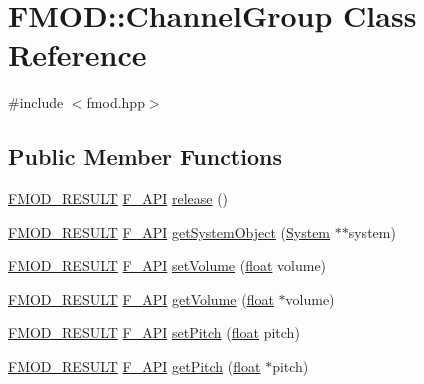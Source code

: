 \hypertarget{class_f_m_o_d_1_1_channel_group}{\section{F\-M\-O\-D\-:\-:Channel\-Group Class Reference}
\label{class_f_m_o_d_1_1_channel_group}
}


{\ttfamily \#include $<$fmod.\-hpp$>$}

\subsection*{Public Member Functions}
\begin{DoxyCompactItemize}
\item 
\hyperlink{fmod_8h_ae6ddadf8cb315e93ae7e6456b19db276}{F\-M\-O\-D\-\_\-\-R\-E\-S\-U\-L\-T} \hyperlink{fmod_8h_ace803d13e798b0cdde4384f9f323b901}{F\-\_\-\-A\-P\-I} \hyperlink{class_f_m_o_d_1_1_channel_group_a4f7fc3cf21050e3cd5e84f8a2f9a0fc9}{release} ()
\item 
\hyperlink{fmod_8h_ae6ddadf8cb315e93ae7e6456b19db276}{F\-M\-O\-D\-\_\-\-R\-E\-S\-U\-L\-T} \hyperlink{fmod_8h_ace803d13e798b0cdde4384f9f323b901}{F\-\_\-\-A\-P\-I} \hyperlink{class_f_m_o_d_1_1_channel_group_ad31856ea134d39c0757e6b6b2abeabcc}{get\-System\-Object} (\hyperlink{class_f_m_o_d_1_1_system}{System} $\ast$$\ast$system)
\item 
\hyperlink{fmod_8h_ae6ddadf8cb315e93ae7e6456b19db276}{F\-M\-O\-D\-\_\-\-R\-E\-S\-U\-L\-T} \hyperlink{fmod_8h_ace803d13e798b0cdde4384f9f323b901}{F\-\_\-\-A\-P\-I} \hyperlink{class_f_m_o_d_1_1_channel_group_ab2202bf291f95b99cb8f69796c7b5405}{set\-Volume} (\hyperlink{fmod_8h_aeb841aa4b4b5f444b5d739d865b420af}{float} volume)
\item 
\hyperlink{fmod_8h_ae6ddadf8cb315e93ae7e6456b19db276}{F\-M\-O\-D\-\_\-\-R\-E\-S\-U\-L\-T} \hyperlink{fmod_8h_ace803d13e798b0cdde4384f9f323b901}{F\-\_\-\-A\-P\-I} \hyperlink{class_f_m_o_d_1_1_channel_group_ac3ccba7965c6b5591dc355e4a785f145}{get\-Volume} (\hyperlink{fmod_8h_aeb841aa4b4b5f444b5d739d865b420af}{float} $\ast$volume)
\item 
\hyperlink{fmod_8h_ae6ddadf8cb315e93ae7e6456b19db276}{F\-M\-O\-D\-\_\-\-R\-E\-S\-U\-L\-T} \hyperlink{fmod_8h_ace803d13e798b0cdde4384f9f323b901}{F\-\_\-\-A\-P\-I} \hyperlink{class_f_m_o_d_1_1_channel_group_af765eda64e3ab4dc771204b1c1850d42}{set\-Pitch} (\hyperlink{fmod_8h_aeb841aa4b4b5f444b5d739d865b420af}{float} pitch)
\item 
\hyperlink{fmod_8h_ae6ddadf8cb315e93ae7e6456b19db276}{F\-M\-O\-D\-\_\-\-R\-E\-S\-U\-L\-T} \hyperlink{fmod_8h_ace803d13e798b0cdde4384f9f323b901}{F\-\_\-\-A\-P\-I} \hyperlink{class_f_m_o_d_1_1_channel_group_a7f209b70b88c1f044ae9ee7debf33834}{get\-Pitch} (\hyperlink{fmod_8h_aeb841aa4b4b5f444b5d739d865b420af}{float} $\ast$pitch)
$$
\end{DoxyCompactItemize}
